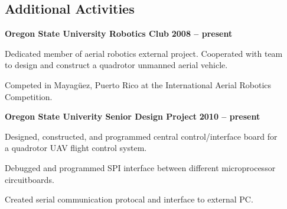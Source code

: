 \documentclass[margin,line]{resume}
\begin{document}
\begin{resume}
    \section{\mysidestyle Additional Activities}

    \textbf{Oregon State University Robotics Club}\vspace{2mm}\vspace{1mm}\hfill \textbf{ 2008 -- present}\vspace{-3mm}\\\vspace{-1mm}%
    \begin{list2}
    \item Dedicated member of aerial robotics external project.  Cooperated with team\\
        to design and construct a quadrotor unmanned aerial vehicle. 
    \item Competed in Mayag\"{u}ez, Puerto Rico at the International Aerial Robotics\\
        Competition.\\
    \end{list2}\vspace{-1.5mm}

    \textbf{Oregon State Univerity Senior Design Project}\vspace{2mm}\hfill \textbf{ 2010 -- present}\vspace{-3mm}\\\vspace{-1mm}%
    \vspace{1mm}
    \begin{list2}
    \item Designed, constructed, and programmed central control/interface board for\\
        a quadrotor UAV flight control system.\\
    \item Debugged and programmed SPI interface between different microprocessor circuitboards.
    \item Created serial communication protocal and interface to external PC.
    \end{list2}\vspace{-1.5mm}


\end{resume}
\end{document}
